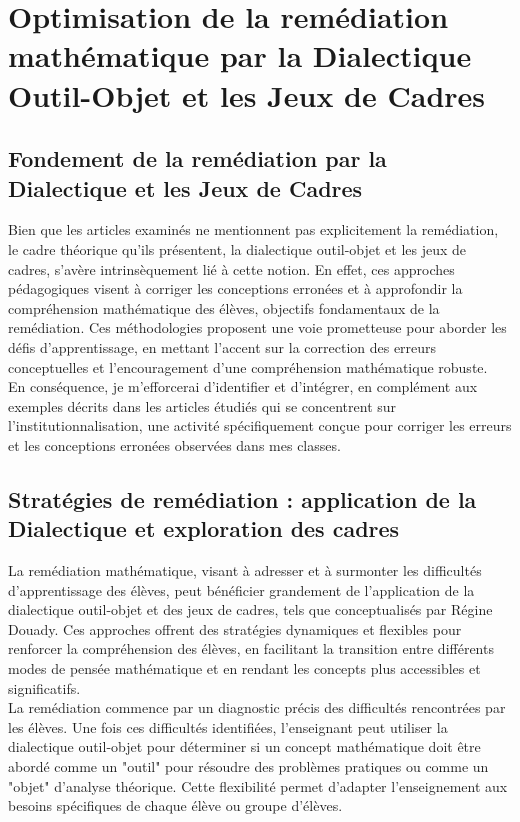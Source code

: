 \section{Optimisation de la remédiation mathématique par la Dialectique Outil-Objet et les Jeux de Cadres}

\subsection{Fondement de la remédiation par la Dialectique et les Jeux de Cadres}

Bien que les articles examinés ne mentionnent pas explicitement la remédiation,
le cadre théorique qu'ils présentent,
la dialectique outil-objet et les jeux de cadres,
s'avère intrinsèquement lié à cette notion.
En effet,
ces approches pédagogiques visent à corriger les conceptions erronées et à approfondir la compréhension mathématique des élèves,
objectifs fondamentaux de la remédiation.
Ces méthodologies proposent une voie prometteuse pour aborder les défis d'apprentissage,
en mettant l'accent sur la correction des erreurs conceptuelles et l'encouragement d'une compréhension mathématique robuste.\\

En conséquence,
je m'efforcerai d'identifier et d'intégrer,
en complément aux exemples décrits dans les articles étudiés qui se concentrent sur l'institutionnalisation,
une activité spécifiquement conçue pour corriger les erreurs et les conceptions erronées observées dans mes classes.

\subsection{Stratégies de remédiation : application de la Dialectique et exploration des cadres}

La remédiation mathématique,
visant à adresser et à surmonter les difficultés d'apprentissage des élèves,
peut bénéficier grandement de l'application de la dialectique outil-objet et des jeux de cadres,
tels que conceptualisés par Régine Douady.
Ces approches offrent des stratégies dynamiques et flexibles pour renforcer la compréhension des élèves,
en facilitant la transition entre différents modes de pensée mathématique et en rendant les concepts plus accessibles et significatifs.\\

La remédiation commence par un diagnostic précis des difficultés rencontrées par les élèves.
Une fois ces difficultés identifiées,
l'enseignant peut utiliser la dialectique outil-objet pour déterminer si un concept mathématique doit être abordé comme un "outil" pour résoudre des problèmes pratiques ou comme un "objet" d'analyse théorique.
Cette flexibilité permet d'adapter l'enseignement aux besoins spécifiques de chaque élève ou groupe d'élèves.\\

